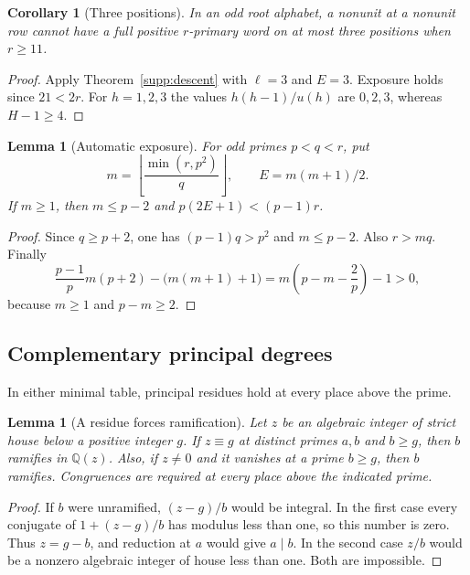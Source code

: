 \documentclass[11pt,a4paper]{article}
\numberwithin{equation}{section}
\newtheorem{lemma}[theorem]{Lemma}
\newtheorem{corollary}[theorem]{Corollary}
\begin{document}
\begin{corollary}[Three positions]\label{supp:three-position}
In an odd root alphabet, a nonunit at a nonunit row cannot
have a full positive $r$-primary word on at most three
positions when $r\ge11$.
\end{corollary}
\begin{proof}
Apply Theorem~\ref{supp:descent} with $\ell=3$ and $E=3$.
Exposure holds since $21<2r$. For $h=1,2,3$ the values
$h(h-1)/u(h)$ are $0,2,3$, whereas $H-1\ge4$.
\end{proof}

\begin{lemma}[Automatic exposure]\label{supp:auto-exposure}
For odd primes $p<q<r$, put
\[
 m=\left\lfloor\frac{\min(r,p^2)}q\right\rfloor,
 \qquad E=m(m+1)/2.
\]
If $m\ge1$, then $m\le p-2$ and
$p(2E+1)<(p-1)r$.
\end{lemma}
\begin{proof}
Since $q\ge p+2$, one has $(p-1)q>p^2$ and $m\le p-2$.
Also $r>mq$. Finally
\[
 \frac{p-1}{p}m(p+2)-\bigl(m(m+1)+1\bigr)
 =m\left(p-m-\frac2p\right)-1>0,
\]
because $m\ge1$ and $p-m\ge2$.
\end{proof}

\subsection{Complementary principal degrees}
\label{red:faces}

In either minimal table, principal residues hold at every place above
the prime.

\begin{lemma}[A residue forces ramification]
\label{red:residue-inertia}
Let $z$ be an algebraic integer of strict house below a positive integer $g$.
If $z\equiv g$ at distinct primes $a,b$ and $b\ge g$, then
$b$ ramifies in $\mathbb Q(z)$. Also, if $z\ne0$ and it vanishes
at a prime $b\ge g$, then $b$ ramifies. Congruences are required
at every place above the indicated prime.
\end{lemma}
\begin{proof}
If $b$ were unramified, $(z-g)/b$ would be integral. In the first
case every conjugate of $1+(z-g)/b$ has modulus less than one,
so this number is zero. Thus $z=g-b$, and reduction at $a$ would
give $a\mid b$. In the second case $z/b$ would be a nonzero
algebraic integer of house less than one. Both are impossible.
\end{proof}
\end{document}
